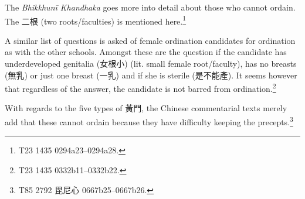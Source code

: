 The {\em Bhikkhunī Khandhaka} goes more into detail about those who cannot ordain. The 二根 (two roots/faculties) is mentioned here.\footnote{T23 1435 0294a23–0294a28.} 

A similar list of questions is asked of female ordination candidates for ordination as with the other schools. Amongst these are the question if the candidate has underdeveloped genitalia (女根小) (lit. small female root/faculty), has no breasts (無乳) or just one breast (一乳) and if she is sterile (是不能產). It seems however that regardless of the answer, the candidate is not barred from ordination.\footnote{T23 1435 0332b11–0332b22.}

With regards to the five types of 黃門, the Chinese commentarial texts merely add that these cannot ordain because they have difficulty keeping the precepts.\footnote{T85 2792 毘尼心 0667b25–0667b26.}
